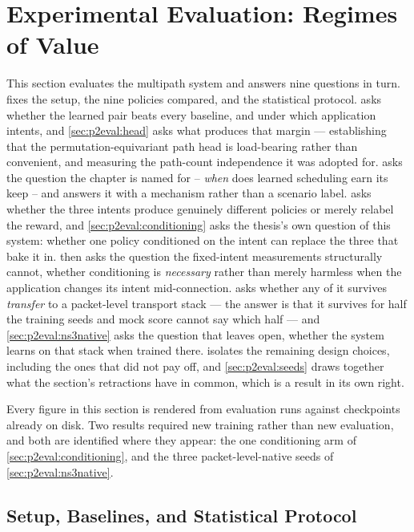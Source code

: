 \section{Experimental Evaluation: Regimes of Value}
\label{sec:mp:eval}

This section evaluates the multipath system and answers nine questions in turn.
 fixes the setup, the nine policies compared, and the statistical protocol.
 asks whether the learned pair beats every baseline, and under which
application intents, and \cref{sec:p2eval:head} asks what produces that margin --- establishing that
the permutation-equivariant path head is load-bearing rather than convenient, and measuring the
path-count independence it was adopted for.  asks the question the chapter is
named for --
\emph{when} does learned scheduling earn its keep -- and answers it with a mechanism rather than a
scenario label.  asks whether the three intents produce genuinely different
policies or merely relabel the reward, and \cref{sec:p2eval:conditioning} asks the thesis's own
question of this system: whether one policy conditioned on the intent can replace the three that bake it
in.  then asks the question the fixed-intent measurements structurally cannot,
whether conditioning is \emph{necessary} rather than merely harmless when the application changes its
intent mid-connection.  asks whether any of it survives \emph{transfer} to a packet-level transport
stack --- the answer is that it survives for half the training seeds and mock score cannot say which
half --- and \cref{sec:p2eval:ns3native} asks the question that leaves open, whether the system learns
on that stack when trained there.  isolates the remaining design choices,
including the ones that did not pay off, and \cref{sec:p2eval:seeds} draws
together what the section's retractions have in common, which is a result in its own right.

Every figure in this section is rendered from evaluation runs against checkpoints already on disk. Two
results required new training rather than new evaluation, and both are identified where they appear: the
one conditioning arm of \cref{sec:p2eval:conditioning}, and the three packet-level-native seeds of
\cref{sec:p2eval:ns3native}.

\subsection{Setup, Baselines, and Statistical Protocol}
\label{sec:p2eval:setup}

